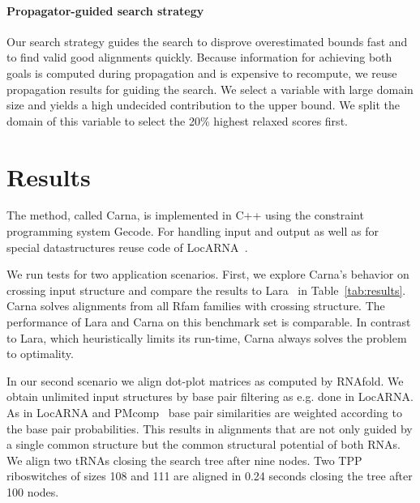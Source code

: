 \documentclass[11pt]{llncs}
\begin{document}
\paragraph{Propagator-guided search strategy}
Our search strategy guides the search to disprove overestimated bounds
fast and to find valid good alignments quickly. Because information
for achieving both goals is computed during propagation and is
expensive to recompute, we reuse propagation results for guiding the
search. We select a variable with large domain size and yields a
high undecided contribution to the upper bound. We split the domain of
this variable to select the 20\% highest relaxed scores first.




\section{Results}

The method, called Carna, is implemented in C++ using the constraint
programming system Gecode. For handling input and output as well as
for special datastructures reuse code of
LocARNA~\cite{Will:etal:_infer_non_codin_rna_famil:PLOS2007}.

We run tests for two application scenarios. First, we explore Carna's
behavior on crossing input structure and compare the results to
Lara~\cite{Bauer:Klau:Reinert:Accur_multi_seque:2007} in
Table~\ref{tab:results}. Carna solves alignments from all Rfam
families with crossing structure. The performance of Lara and Carna on
this benchmark set is comparable. In contrast to Lara, which
heuristically limits its run-time, Carna always solves the problem to
optimality.

In our second scenario we align dot-plot matrices as computed by
RNAfold\cite{Hofacker:Fontana:Stadler:Bonhoeffer:Tacker:Schuster:MonChem1994}. We
obtain unlimited input structures by base pair filtering as e.g. done
in LocARNA. As in LocARNA and
PMcomp~\cite{Hofacker:Bernhart:Stadler:Align_RNA_base:2004} base pair
similarities are weighted according to the base pair
probabilities. This results in alignments that are not only guided by
a single common structure but the common structural potential of both
RNAs. We align two tRNAs closing the search tree after nine nodes. Two
TPP riboswitches of sizes 108 and 111 are aligned in 0.24 seconds
closing the tree after 100 nodes.
\end{document}

